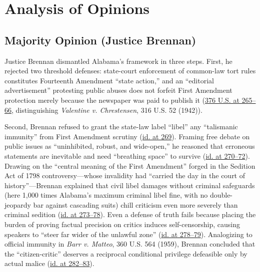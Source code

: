 \documentclass[12pt]{article}
\begin{document}
\section{Analysis of Opinions}
\subsection{Majority Opinion (Justice Brennan)}

Justice Brennan dismantled Alabama's framework in three steps. First, he rejected two threshold defenses: state-court enforcement of common-law tort rules constitutes Fourteenth Amendment ``state action,'' and an ``editorial advertisement'' protesting public abuses does not forfeit First Amendment protection merely because the newspaper was paid to publish it (\href{https://supreme.justia.com/cases/federal/us/376/254/}{376 U.S. at 265--66}, distinguishing \textit{Valentine v. Chrestensen}, 316 U.S. 52 (1942)).

Second, Brennan refused to grant the state-law label ``libel'' any ``talismanic immunity'' from First Amendment scrutiny (\href{https://supreme.justia.com/cases/federal/us/376/254/}{id. at 269}). Framing free debate on public issues as ``uninhibited, robust, and wide-open,'' he reasoned that erroneous statements are inevitable and need ``breathing space'' to survive (\href{https://supreme.justia.com/cases/federal/us/376/254/}{id. at 270--72}). Drawing on the ``central meaning of the First Amendment'' forged in the Sedition Act of 1798 controversy---whose invalidity had ``carried the day in the court of history''---Brennan explained that civil libel damages without criminal safeguards (here 1,000 times Alabama's maximum criminal libel fine, with no double-jeopardy bar against cascading suits) chill criticism even more severely than criminal sedition (\href{https://www.law.cornell.edu/supremecourt/text/376/254}{id. at 273--78}). Even a defense of truth fails because placing the burden of proving factual precision on critics induces self-censorship, causing speakers to ``steer far wider of the unlawful zone'' (\href{https://supreme.justia.com/cases/federal/us/376/254/}{id. at 278--79}). Analogizing to official immunity in \textit{Barr v. Matteo}, 360 U.S. 564 (1959), Brennan concluded that the ``citizen-critic'' deserves a reciprocal conditional privilege defeasible only by actual malice (\href{https://supreme.justia.com/cases/federal/us/376/254/}{id. at 282--83}).
\end{document}
